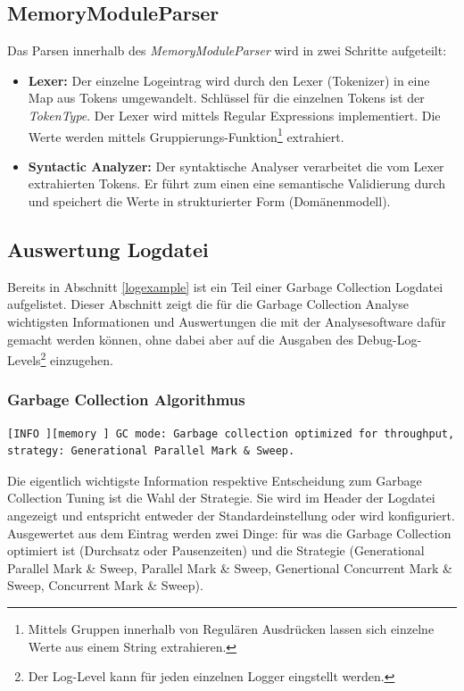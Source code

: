 \subsection{MemoryModuleParser}
Das Parsen innerhalb des \textit{MemoryModuleParser} wird in zwei Schritte aufgeteilt:
\begin{itemize}
\item \textbf{Lexer: }Der einzelne Logeintrag wird durch den Lexer (Tokenizer) in eine Map aus Tokens umgewandelt. Schlüssel für die einzelnen Tokens ist der \textit{TokenType}. Der Lexer wird mittels Regular Expressions implementiert. Die Werte werden mittels Gruppierungs-Funktion\footnote{Mittels Gruppen innerhalb von Regulären Ausdrücken lassen sich einzelne Werte aus einem String extrahieren.} extrahiert. 
\item \textbf{Syntactic Analyzer: }Der syntaktische Analyser verarbeitet die vom Lexer extrahierten Tokens. Er führt zum einen eine semantische Validierung durch und speichert die Werte in strukturierter Form (Domänenmodell).
\end{itemize}

\subsection{Auswertung Logdatei}
Bereits in Abschnitt \ref{logexample} ist ein Teil einer Garbage Collection Logdatei aufgelistet. Dieser Abschnitt zeigt die für die Garbage Collection Analyse wichtigsten Informationen und Auswertungen die mit der Analysesoftware dafür gemacht werden können, ohne dabei aber auf die Ausgaben des Debug-Log-Levels\footnote{Der Log-Level kann für jeden einzelnen Logger eingstellt werden.} einzugehen.

\subsubsection{Garbage Collection Algorithmus}
\begin{lstlisting}[numbers=none,  framexleftmargin=0mm, caption=Logdatei: Ausgabe initialer Garbage Collection Algorithmus]
[INFO ][memory ] GC mode: Garbage collection optimized for throughput, strategy: Generational Parallel Mark & Sweep.
\end{lstlisting}
Die eigentlich wichtigste Information respektive Entscheidung zum Garbage Collection Tuning ist die Wahl der Strategie. Sie wird im Header der Logdatei angezeigt und entspricht entweder der Standardeinstellung oder wird konfiguriert. Ausgewertet aus dem Eintrag werden zwei Dinge: für was die Garbage Collection optimiert ist (Durchsatz oder Pausenzeiten) und die Strategie (Generational Parallel Mark \& Sweep, Parallel Mark \& Sweep, Genertional Concurrent Mark \& Sweep, Concurrent Mark \& Sweep).
	
